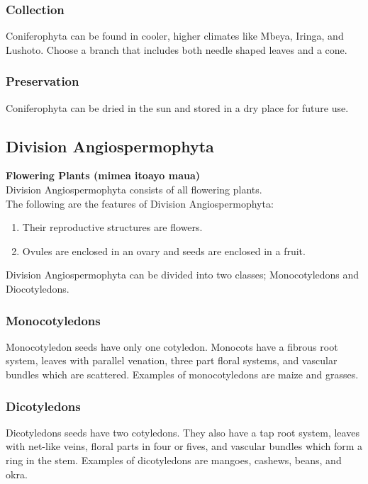 \subsubsection{Collection}
Coniferophyta can be found in cooler, higher climates like Mbeya, Iringa, and Lushoto. Choose a branch that includes both needle shaped leaves and a cone.

\subsubsection*{Preservation} 
Coniferophyta can be dried in the sun and stored in a dry place for future use.

\subsection{Division Angiospermophyta}
\textbf{Flowering Plants (mimea itoayo maua)}\\ 
Division Angiospermophyta consists of all flowering plants. \\
The following are the features of Division Angiospermophyta:
\begin{enumerate}
\item{Their reproductive structures are flowers.} 
\item{Ovules are enclosed in an ovary and seeds are enclosed in a fruit.}
\end{enumerate}

Division Angiospermophyta can be divided into two classes; Monocotyledons and Diocotyledons.

\subsubsection*{\textbf{Monocotyledons}}
Monocotyledon seeds have only one cotyledon. Monocots have a fibrous root system, leaves with parallel venation, three part floral systems, and vascular bundles which are scattered. Examples of monocotyledons are maize and grasses.

\subsubsection*{\textbf{Dicotyledons}}
Dicotyledons seeds have two cotyledons. They also have a tap root system, leaves with net-like veins, floral parts in four or fives, and vascular bundles which form a ring in the stem. Examples of dicotyledons are mangoes, cashews, beans, and okra.

